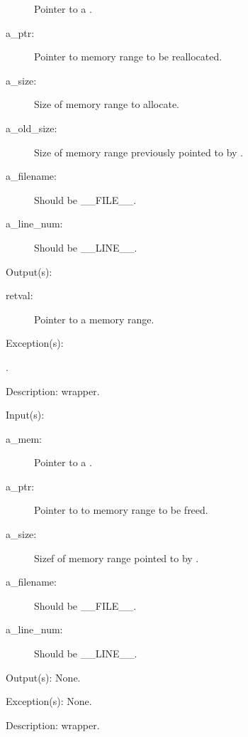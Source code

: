 \begin{capi}
\begin{capilist}
\begin{description}
			Pointer to a .
		\item[a\_ptr: ]
			Pointer to memory range to be reallocated.
		\item[a\_size: ]
			Size of memory range to allocate.
		\item[a\_old\_size: ]
			Size of memory range previously pointed to by
			.
		\item[a\_filename: ]
			Should be \_\_FILE\_\_.
		\item[a\_line\_num: ]
			Should be \_\_LINE\_\_.
		\end{description}
	\item[Output(s): ]
		\begin{description}\item[]
		\item[retval: ]
			Pointer to a memory range.
		\end{description}
	\item[Exception(s): ]
		\begin{description}\item[]
		\item[.]
		\end{description}
	\item[Description: ]
		 wrapper.
	\end{capilist}
\label{mem_free_e}
\label{mem_free}
\label{cw_free}
	\begin{capilist}
	\item[Input(s): ]
		\begin{description}\item[]
		\item[a\_mem: ]
			Pointer to a .
		\item[a\_ptr: ]
			Pointer to to memory range to be freed.
		\item[a\_size: ]
			Sizef of memory range pointed to by .
		\item[a\_filename: ]
			Should be \_\_FILE\_\_.
		\item[a\_line\_num: ]
			Should be \_\_LINE\_\_.
		\end{description}
	\item[Output(s): ] None.
	\item[Exception(s): ] None.
	\item[Description: ]
		 wrapper.
	\end{capilist}
\end{capi}
